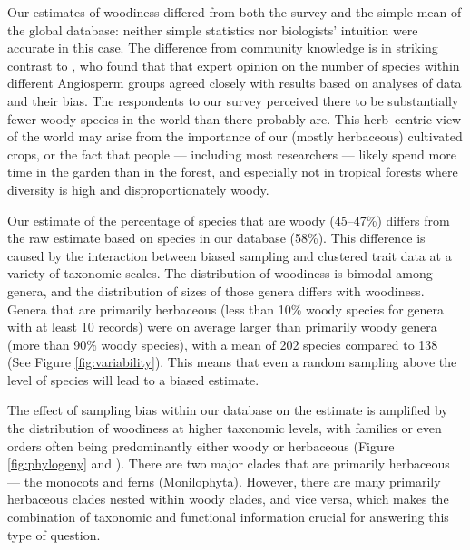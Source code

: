 \documentclass[a4paper,12pt]{article}
\begin{document}
Our estimates of woodiness differed from both the survey and the
simple mean of the global database: neither simple statistics nor
biologists' intuition were accurate in this case.  The difference from
community knowledge is in striking contrast to \citet{joppa2010}, who
found that that expert opinion on the number of species within
different Angiosperm groups agreed closely with results based on
analyses of data and their bias.
The respondents to our survey perceived there to be substantially
fewer woody species in the world than there probably are.  This
herb--centric view of the world may arise from the importance of our
(mostly herbaceous) cultivated crops, or the fact that people ---
including most researchers --- likely spend more time in the garden than in
the forest, and especially not in tropical forests where diversity is high and disproportionately woody.

%
Our estimate of the percentage of species that are woody (45--47\%)
differs from the raw estimate based on species in our database (58\%).
This difference is caused by the interaction between biased sampling
and clustered trait data at a variety of taxonomic scales.
%
The distribution of woodiness is bimodal among genera, and the
distribution of sizes of those genera differs with woodiness.  Genera
that are primarily herbaceous (less than 10\% woody species for genera
with at least 10 records) were on average larger than primarily woody
genera (more than 90\% woody species), with a mean of 202 species
compared to 138 (See Figure \ref{fig:variability}).  This means that
even a random sampling above the level of species will lead to a
biased estimate.

The effect of sampling bias within our database on the estimate is
amplified by the distribution of woodiness at higher taxonomic levels,
with families or even orders often being predominantly either woody or
herbaceous (Figure \ref{fig:phylogeny} and
\citealt{sinnott1915evolution}).  There are two major clades that are
primarily herbaceous --- the monocots and ferns
(Monilophyta). However, there are many primarily herbaceous clades
nested within woody clades, and vice versa, which makes the
combination of taxonomic and functional information crucial for
answering this type of question.
\end{document}
